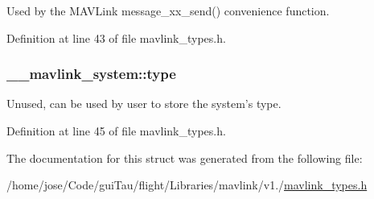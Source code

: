 Used by the M\-A\-V\-Link message\-\_\-xx\-\_\-send() convenience function. 



Definition at line 43 of file mavlink\-\_\-types.\-h.

\hypertarget{struct____mavlink__system_aab94b93e251cac8de298a0ff90c41b8f}{
\subsubsection[{type}]{ \-\_\-\-\_\-mavlink\-\_\-system\-::type}}\label{struct____mavlink__system_aab94b93e251cac8de298a0ff90c41b8f}


Unused, can be used by user to store the system's type. 



Definition at line 45 of file mavlink\-\_\-types.\-h.



The documentation for this struct was generated from the following file\-:\begin{DoxyCompactItemize}
\item 
/home/jose/\-Code/gui\-Tau/flight/\-Libraries/mavlink/v1./\hyperlink{mavlink__types_8h}{mavlink\-\_\-types.\-h}\end{DoxyCompactItemize}
